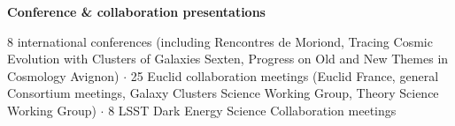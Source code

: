 \documentclass[11pt]{article}
\begin{document}
\textbf{Conference \& collaboration presentations}

8 international conferences (including Rencontres de Moriond, Tracing Cosmic Evolution with Clusters of Galaxies Sexten, Progress on Old and New Themes in Cosmology Avignon) $\cdot$ 25 Euclid collaboration meetings (Euclid France, general Consortium meetings, Galaxy Clusters Science Working Group, Theory Science Working Group) $\cdot$ 8 LSST Dark Energy Science Collaboration meetings

\end{document}
